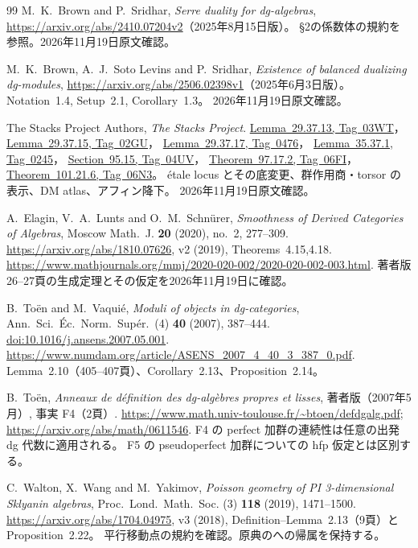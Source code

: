 \documentclass[11pt,a4paper]{ltjsarticle}
\numberwithin{equation}{section}
\begin{document}
\begin{thebibliography}{99}
M.~K.~Brown and P.~Sridhar, \emph{Serre duality for dg-algebras},
\url{https://arxiv.org/abs/2410.07204v2}（2025年8月15日版）。
\S2の係数体の規約を参照。2026年11月19日原文確認。

M.~K.~Brown, A.~J.~Soto Levins and P.~Sridhar,
\emph{Existence of balanced dualizing dg-modules},
\url{https://arxiv.org/abs/2506.02398v1}（2025年6月3日版）。
Notation~1.4, Setup~2.1, Corollary~1.3。
2026年11月19日原文確認。

The Stacks Project Authors, \emph{The Stacks Project}.
\href{https://stacks.math.columbia.edu/tag/03WT}{Lemma~29.37.13, Tag~03WT}，
\href{https://stacks.math.columbia.edu/tag/02GU}{Lemma~29.37.15, Tag~02GU}，
\href{https://stacks.math.columbia.edu/tag/0476}{Lemma~29.37.17, Tag~0476}，
\href{https://stacks.math.columbia.edu/tag/0245}{Lemma~35.37.1, Tag~0245}，
\href{https://stacks.math.columbia.edu/tag/04UV}{Section~95.15, Tag~04UV}，
\href{https://stacks.math.columbia.edu/tag/06FI}{Theorem~97.17.2, Tag~06FI}，
\href{https://stacks.math.columbia.edu/tag/06N3}{Theorem~101.21.6, Tag~06N3}。
étale locus とその底変更、群作用商・torsor の表示、DM atlas、アフィン降下。
2026年11月19日原文確認。

A.~Elagin, V.~A.~Lunts and O.~M.~Schn\"urer,
\emph{Smoothness of Derived Categories of Algebras},
Moscow Math.~J. \textbf{20} (2020), no.~2, 277--309.
\url{https://arxiv.org/abs/1810.07626}, v2 (2019), Theorems~4.15,4.18.
\url{https://www.mathjournals.org/mmj/2020-020-002/2020-020-002-003.html}.
著者版26--27頁の生成定理とその仮定を2026年11月19日に確認。

B.~To\"en and M.~Vaqui\'e,
\emph{Moduli of objects in dg-categories},
Ann.~Sci.~\'Ec.~Norm.~Sup\'er.~(4) \textbf{40} (2007), 387--444.
\href{https://doi.org/10.1016/j.ansens.2007.05.001}{doi:10.1016/j.ansens.2007.05.001}.
\url{https://www.numdam.org/article/ASENS_2007_4_40_3_387_0.pdf}.
Lemma~2.10（405--407頁）、Corollary~2.13、Proposition~2.14。

B.~To\"en,
\emph{Anneaux de d\'efinition des dg-alg\`ebres propres et lisses},
著者版（2007年5月）, 事実 F4（2頁）.
\url{https://www.math.univ-toulouse.fr/~btoen/defdgalg.pdf};
\url{https://arxiv.org/abs/math/0611546}.
F4 の perfect 加群の連続性は任意の出発 dg 代数に適用される。
F5 の pseudoperfect 加群についての hfp 仮定とは区別する。

C.~Walton, X.~Wang and M.~Yakimov,
\emph{Poisson geometry of PI 3-dimensional Sklyanin algebras},
Proc.~Lond.~Math.~Soc. (3) \textbf{118} (2019), 1471--1500.
\url{https://arxiv.org/abs/1704.04975}, v3 (2018),
Definition--Lemma~2.13（9頁）と Proposition~2.22。
平行移動点の規約を確認。原典の\cite{ATV}への帰属を保持する。


\end{thebibliography}
\end{document}
